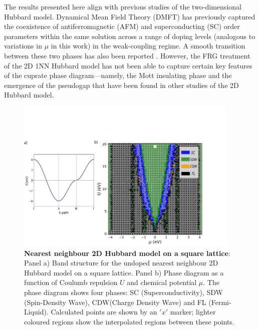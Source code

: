 \documentclass[12pt]{article}
\begin{document}
\medskip

\noindent The results presented here align with previous studies of the two-dimensional Hubbard model. Dynamical Mean Field Theory (DMFT) has 
previously captured the coexistence of antiferromagnetic (AFM) and superconducting (SC) order parameters within the same solution across a range of doping levels (analogous to variations in 
$\mu$ in this work) in the weak-coupling regime. A smooth transition between these two phases has also been reported \cite{capone2006competition}. However, the FRG treatment of the 2D 1NN Hubbard model has not been able to capture certain key features
of the cuprate phase diagram—namely, the Mott insulating phase and the emergence of the pseudogap that have been found in other studies of the 2D Hubbard model\cite{katanin2009comparing,otsuki2014superconductivity}.


\begin{figure}[htbp]  %
    \centering
    \includegraphics[width=0.95\textwidth]{1NNphased.png}  %
    \caption{\textbf{Nearest neighbour 2D Hubbard model on a square lattice}: 
    Panel a) Band structure for the undoped nearest neighbour 2D Hubbard model on a square lattice.
    Panel b) Phase diagram as a function of Coulumb repulsion $U$ and chemical 
    potential $\mu$. The phase diagram shows four phases: SC (Superconductivity), SDW (Spin-Density Wave), CDW(Charge Density Wave) and FL (Fermi-Liquid).
    Calculated points are shown by an $'x'$ marker; lighter coloured regions show the interpolated regions between these points.}

    \label{fig:1NNpd}
\end{figure}
\end{document}

